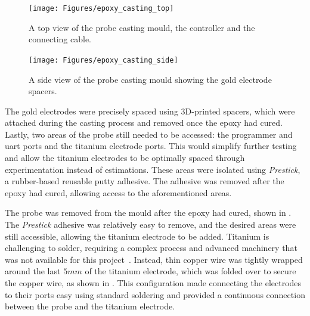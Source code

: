 \begin{figure}[ht]
    \begin{minipage}{0.49\textwidth}
        \centering
        \texttt{[image: Figures/epoxy\_casting\_top]}
        \caption{A top view of the probe casting mould, the controller and the connecting cable.}
        \label{fig:epoxy-top} %
    \end{minipage}
    \begin{minipage}{0.49\textwidth}
        \centering
        \texttt{[image: Figures/epoxy\_casting\_side]}
        \caption{A side view of the probe casting mould showing the gold electrode spacers.}
        \label{fig:epoxy-side} %
    \end{minipage}
\end{figure}

The gold electrodes were precisely spaced using 3D-printed spacers, which were attached during the casting process and removed once the epoxy had cured.
Lastly, two areas of the probe still needed to be accessed: the programmer and \gls{uart} ports and the titanium electrode ports.
This would simplify further testing and allow the titanium electrodes to be optimally spaced through experimentation instead of estimations.
These areas were isolated using \textit{Prestick}, a rubber-based reusable putty adhesive. 
The adhesive was removed after the epoxy had cured, allowing access to the aforementioned areas.

The probe was removed from the mould after the epoxy had cured, shown in .
The \textit{Prestick} adhesive was relatively easy to remove, and the desired areas were still accessible, allowing the titanium electrode to be added.
Titanium is challenging to solder, requiring a complex process and advanced machinery that was not available for this project~\cite{totalmateria_joining_titanium_2005}.
Instead, thin copper wire was tightly wrapped around the last $5mm$ of the titanium electrode, which was folded over to secure the copper wire, as shown in .
This configuration made connecting the electrodes to their ports easy using standard soldering and provided a continuous connection between the probe and the titanium electrode.

